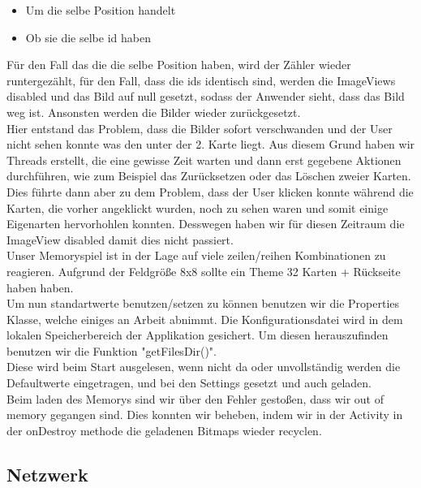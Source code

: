 \documentclass[11pt,a4paper]{article}
\begin{document}
\begin{itemize}
	\item Um die selbe Position handelt 
	\item Ob sie die selbe id haben
\end{itemize}
	Für den Fall das die die selbe Position haben, wird der Zähler wieder runtergezählt, für den Fall, dass die ids identisch sind, werden die ImageViews disabled und das Bild auf null gesetzt, sodass der Anwender sieht, dass das Bild weg ist. Ansonsten werden die Bilder wieder zurückgesetzt. \\
Hier entstand das Problem, dass die Bilder sofort verschwanden und der User nicht sehen konnte was den unter der 2. Karte liegt. Aus diesem Grund haben wir Threads erstellt, die eine gewisse Zeit warten und dann erst gegebene Aktionen durchführen, wie zum Beispiel das Zurücksetzen oder das Löschen zweier Karten. \\
Dies führte dann aber zu dem Problem, dass der User klicken konnte während die Karten, die vorher angeklickt wurden, noch zu sehen waren und somit einige Eigenarten hervorhohlen konnten. Desswegen haben wir für diesen Zeitraum die ImageView disabled damit dies nicht passiert.\\
Unser Memoryspiel ist in der Lage auf viele zeilen/reihen 
Kombinationen zu reagieren. Aufgrund der Feldgröße 8x8 sollte ein 
Theme 32 Karten + Rückseite haben haben. \\
Um nun standartwerte benutzen/setzen zu können benutzen wir die Properties Klasse, welche einiges an Arbeit abnimmt. Die Konfigurationsdatei wird in dem lokalen Speicherbereich der Applikation gesichert. Um diesen herauszufinden benutzen wir die Funktion "getFilesDir()".\\
Diese wird beim Start ausgelesen, wenn nicht da oder unvollständig werden die Defaultwerte eingetragen, und bei den Settings gesetzt und auch geladen. \\
Beim laden des Memorys sind wir über den Fehler gestoßen, dass wir out of memory gegangen sind. Dies konnten wir beheben, indem wir in der Activity in der onDestroy methode die geladenen  Bitmaps wieder recyclen.

\subsection{Netzwerk}
\end{document}
